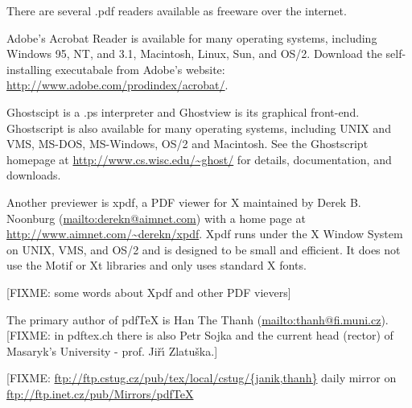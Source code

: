 \documentclass[11pt]{article}
\begin{document}
{ 

  There are several .pdf readers available as freeware over the
  internet.

  Adobe's Acrobat Reader is available for many operating systems,
  including Windows 95, NT, and 3.1, Macintosh, Linux, Sun, and OS/2.
  Download the self-installing executabale from Adobe's website:
  \url{http://www.adobe.com/prodindex/acrobat/}.

  Ghostscipt is a .ps interpreter and Ghostview is its graphical
  front-end.  Ghostscript is also available for many operating
  systems, including UNIX and VMS, MS-DOS, MS-Windows, OS/2 and
  Macintosh.  See the Ghostscript homepage at
  \url{http://www.cs.wisc.edu/~ghost/} for details, documentation, and
  downloads.

  Another previewer is xpdf, a PDF viewer for X maintained by Derek B.
  Noonburg (\url{mailto:derekn@aimnet.com}) with a home page at
  \url{http://www.aimnet.com/~derekn/xpdf}. Xpdf runs under the X
  Window System on UNIX, VMS, and OS/2 and is designed to be small and
  efficient.  It does not use the Motif or Xt libraries and only uses
  standard X fonts.

  [FIXME: some words about Xpdf and other PDF vievers] }





{

  The primary author of pdfTeX is Han The Thanh
  (\url{mailto:thanh@fi.muni.cz}).  [FIXME: in pdftex.ch there is also
  Petr Sojka and the current head (rector) of Masaryk's University -
  prof. Ji\v{r}\'{\i} Zlatu\v{s}ka.]  }




{


[FIXME: \url{ftp://ftp.cstug.cz/pub/tex/local/cstug/{janik,thanh}}
  daily mirror on \url{ftp://ftp.inet.cz/pub/Mirrors/pdfTeX} }


\end{document}
